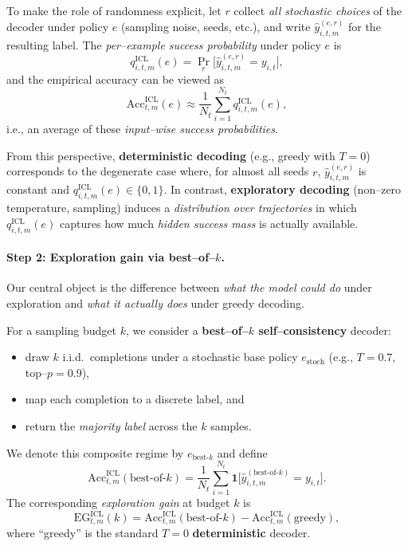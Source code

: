 To make the role of randomness explicit, let $r$ collect \emph{all stochastic
choices} of the decoder under policy $e$ (sampling noise, seeds, etc.), and
write $\hat{y}^{(e,r)}_{i,t,m}$ for the resulting label. The
\emph{per--example success probability} under policy $e$ is
\[
q^{\text{ICL}}_{i,t,m}(e)
= \Pr_{r}\big[\hat{y}^{(e,r)}_{i,t,m} = y_{i,t}\big],
\]
and the empirical accuracy can be viewed as
\[
\mathrm{Acc}^{\text{ICL}}_{t,m}(e)
\approx \frac{1}{N_t} \sum_{i=1}^{N_t}
q^{\text{ICL}}_{i,t,m}(e),
\]
i.e., an average of these \emph{input--wise success probabilities}.

From this perspective, \textbf{deterministic decoding} (e.g., greedy with
$T{=}0$) corresponds to the degenerate case where, for almost all seeds $r$,
$\hat{y}^{(e,r)}_{i,t,m}$ is constant and
$q^{\text{ICL}}_{i,t,m}(e)\in\{0,1\}$. In contrast,
\textbf{exploratory decoding} (non--zero temperature, sampling) induces a
\emph{distribution over trajectories} in which $q^{\text{ICL}}_{i,t,m}(e)$
captures how much \emph{hidden success mass} is actually available.

\vspace{0.3em}
\paragraph{\textbf{Step 2: Exploration gain via best--of--$k$.}}
Our central object is the difference between \emph{what the model could do}
under exploration and \emph{what it actually does} under greedy decoding.

For a sampling budget $k$, we consider a \textbf{best--of--$k$
self--consistency} decoder:
\begin{itemize}[leftmargin=1.5em]
  \item draw $k$ i.i.d.\ completions under a stochastic base policy
        $e_{\text{stoch}}$ (e.g., $T{=}0.7$, top--$p{=}0.9$),
  \item map each completion to a discrete label, and
  \item return the \emph{majority label} across the $k$ samples.
\end{itemize}
We denote this composite regime by $e_{\text{best-}k}$ and define
\[
\mathrm{Acc}^{\text{ICL}}_{t,m}(\text{best-of-}k)
= \frac{1}{N_t} \sum_{i=1}^{N_t}
  \mathbf{1}\big[ \hat{y}^{(\text{best-of-}k)}_{i,t,m} = y_{i,t} \big].
\]
The corresponding \emph{exploration gain} at budget $k$ is
\[
\mathrm{EG}^{\text{ICL}}_{t,m}(k)
= \mathrm{Acc}^{\text{ICL}}_{t,m}(\text{best-of-}k)
- \mathrm{Acc}^{\text{ICL}}_{t,m}(\text{greedy}),
\]
where ``greedy'' is the standard $T{=}0$ \textbf{deterministic} decoder.

